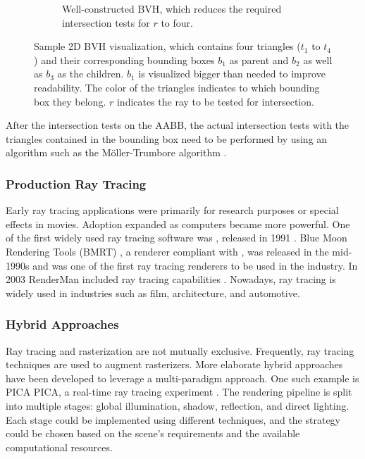 \begin{figure}[H]
\begin{subfigure}[b]{0.45\textwidth}
    \caption{Well-constructed \gls{BVH}, which reduces the required intersection tests for $r$ to four.}
    \label{fig:bvhGood}
  \end{subfigure}
  \caption{Sample 2D \gls{BVH} visualization, which contains four triangles ($t_1$ to $t_4$) and their corresponding bounding boxes $b_1$ as parent and $b_2$ as well as $b_3$ as the children. $b_1$ is visualized bigger than needed to improve readability. The color of the triangles indicates to which bounding box they belong. $r$ indicates the ray to be tested for intersection.}
  \label{fig:bvhVisualized}
\end{figure}

After the intersection tests on the \gls{AABB}, the actual intersection tests with the triangles contained in the bounding box need to be performed by using an algorithm such as the Möller-Trumbore algorithm \cite{mollerTrumboreFastRayTriangleIntersection}.

\subsubsection{Production Ray Tracing}

Early ray tracing applications were primarily for research purposes or special effects in movies. Adoption expanded as computers became more powerful. One of the first widely used ray tracing software was , released in 1991 \cite{POV_Ray_Documentation}. Blue Moon Rendering Tools (\gls{BMRT}) \cite{bmrt}, a renderer compliant with , was released in the mid-1990s and was one of the first ray tracing renderers to be used in the industry. In 2003 \gls{RenderMan} included ray tracing capabilities \cite{RenderMan_11_Release_Notes}. Nowadays, ray tracing is widely used in industries such as film, architecture, and automotive.

\subsubsection{Hybrid Approaches}

Ray tracing and rasterization are not mutually exclusive. Frequently, ray tracing techniques are used to augment rasterizers. More elaborate hybrid approaches have been developed to leverage a multi-paradigm approach. One such example is PICA PICA, a real-time ray tracing experiment \cite{hybridRenderingBarreBrisebois2019}. The rendering pipeline is split into multiple stages: global illumination, shadow, reflection, and direct lighting. Each stage could be implemented using different techniques, and the strategy could be chosen based on the scene's requirements and the available computational resources.

